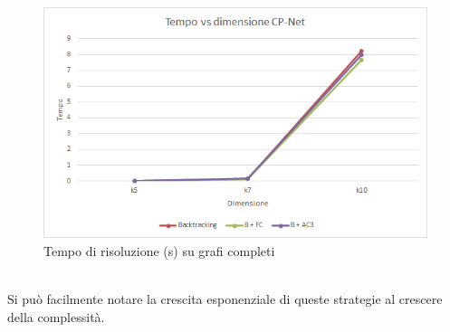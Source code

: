 \documentclass[a4paper,titlepage]{article}
\begin{document}
\begin{figure}[!h]
\centering
\includegraphics[scale=0.75]{../img/TempoK.png}
\caption{Tempo di risoluzione (s) su grafi completi}\label{fig:test7}
\end{figure}
\\Si può facilmente notare la crescita esponenziale di queste strategie al crescere della complessità.
\end{document}
